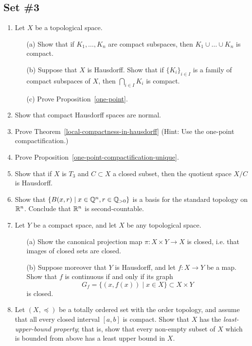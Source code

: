 \subsection{Set \#3}
  \begin{enumerate}[label=3.\arabic*]
    \item \label{one-point-exercise}Let $X$ be a topological space.
    \begin{itemize}
      \item[(a)] Show that if $K_1, \dots, K_n$ are compact subspaces, then $K_1 \cup \dots \cup K_n$ is compact.
      \item[(b)] Suppose that $X$ is Hausdorff. Show that if $\{K_i\}_{i \in I}$ is a family of compact subspaces of $X$, then $\bigcap_{i \in I} K_i$ is compact.
      \item[(c)] Prove Proposition~\ref{one-point}.
    \end{itemize}
    \item \label{compact-hausdorff-are-normal-exercise} Show that compact Hausdorff spaces are normal.
    \item \label{local-compactness-in-hausdorff-exercise}Prove Theorem~\ref{local-compactness-in-hausdorff} (Hint: Use the one-point compactification.)
    \item \label{one-point-compactification-unique-exercise}Prove Proposition~\ref{one-point-compactification-unique}.
    \item Show that if $X$ is $T_3$ and $C \subset X$ a closed subset, then the quotient space $X/C$ is Hausdorff.
    \item \label{second-countable-exercise}Show that $\{B(x,r) \mid x \in \mathbb{Q}^n, r \in \mathbb{Q}_{> 0}\}$ is a basis for the standard topology on $\mathbb{R}^n$. Conclude that $\mathbb{R}^n$ is second-countable.
    \item Let $Y$ be a compact space, and let $X$ be any topological space.
      \begin{itemize}
      \item[(a)] Show the canonical projection map $\pi : X \times Y \to X$ is closed, i.e. that images of closed sets are closed.
      \item[(b)] Suppose moreover that $Y$ is Hausdorff, and let $f : X \to Y$ be a map. Show that $f$ is continuous if and only if its graph
        \[
          G_f = \{(x,f(x)) \mid x \in X\} \subset X \times Y
        \]
        is closed.
      \end{itemize}
    \item Let $(X,\preceq)$ be a totally ordered set with the order topology, and assume that all every closed interval $[a,b]$ is compact. Show that $X$ has the \emph{least-upper-bound property}; that is, show that every non-empty subset of $X$ which is bounded from above has a least upper bound in $X$.

\end{enumerate}
